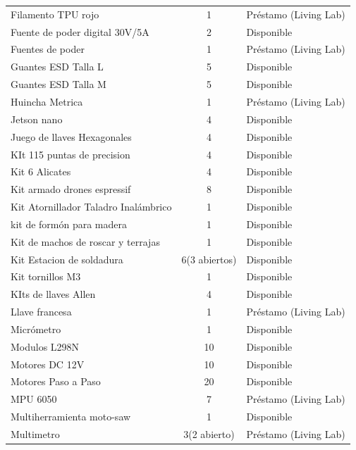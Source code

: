 \begin{longtable}{p{8.5cm} c l}
  Filamento TPU rojo & 1 & \cellcolor{azulPrestamo} Préstamo (Living Lab) \\
  Fuente de poder digital 30V/5A & 2 & \cellcolor{verdeOk} Disponible \\
  Fuentes de poder & 1 & \cellcolor{azulPrestamo} Préstamo (Living Lab) \\
  Guantes ESD Talla L & 5 & \cellcolor{verdeOk} Disponible \\
  Guantes ESD Talla M & 5 & \cellcolor{verdeOk} Disponible \\
  Huincha Metrica & 1 & \cellcolor{azulPrestamo} Préstamo (Living Lab) \\
  Jetson nano & 4 & \cellcolor{verdeOk} Disponible \\
  Juego de llaves Hexagonales & 4 & \cellcolor{verdeOk} Disponible \\
  KIt 115 puntas de precision & 4 & \cellcolor{verdeOk} Disponible \\
  Kit 6 Alicates & 4 & \cellcolor{verdeOk} Disponible \\
  Kit armado drones espressif & 8 & \cellcolor{verdeOk} Disponible \\
  Kit Atornillador Taladro Inalámbrico & 1 & \cellcolor{verdeOk} Disponible \\
  kit de formón para madera & 1 & \cellcolor{verdeOk} Disponible \\
  Kit de machos de roscar y terrajas & 1 & \cellcolor{verdeOk} Disponible \\
  Kit Estacion de soldadura & 6(3 abiertos) & \cellcolor{verdeOk} Disponible \\
  Kit tornillos M3 & 1 & \cellcolor{verdeOk} Disponible \\
  KIts de llaves Allen & 4 & \cellcolor{verdeOk} Disponible \\
  Llave francesa & 1 & \cellcolor{azulPrestamo} Préstamo (Living Lab) \\
  Micrómetro & 1 & \cellcolor{verdeOk} Disponible \\
  Modulos L298N & 10 & \cellcolor{verdeOk} Disponible \\
  Motores DC 12V & 10 & \cellcolor{verdeOk} Disponible \\
  Motores Paso a Paso & 20 & \cellcolor{verdeOk} Disponible \\
  MPU 6050 & 7 & \cellcolor{azulPrestamo} Préstamo (Living Lab) \\
  Multiherramienta moto-saw & 1 & \cellcolor{verdeOk} Disponible \\
  Multimetro & 3(2 abierto) & \cellcolor{azulPrestamo} Préstamo (Living Lab) \\

\end{longtable}
